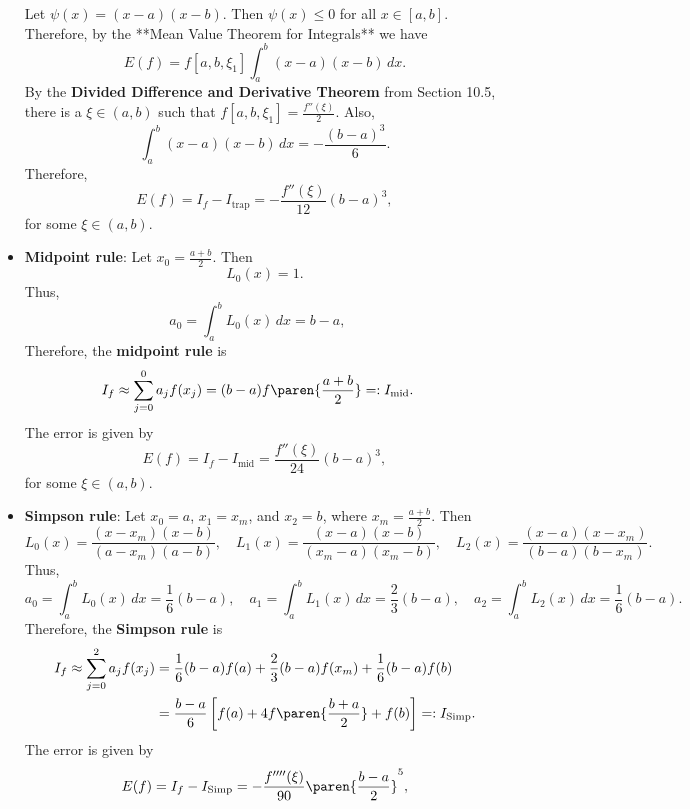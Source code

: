 \documentclass{report}
\begin{document}
\begin{itemize}
$$            $$
            Let $\psi(x) = (x - a)(x - b)$. Then $\psi(x) \leq 0$ for all $x \in [a,b]$. Therefore, by the **Mean Value Theorem for Integrals** we have
            $$
            E(f) = f[a,b,\xi_1] \int_a^b (x - a)(x - b)\,dx.
            $$
            By the \textbf{Divided Difference and Derivative Theorem} from Section 10.5, there is a $\xi \in (a, b)$ such that $f[a,b,\xi_1] = \frac{f''(\xi)}{2}$. Also, 
            $$
            \int_a^b (x - a)(x - b)\,dx = -\frac{(b - a)^3}{6}.
            $$
            Therefore,
            $$
            E(f) = I_f - I_{\mathrm{trap}} =  -\frac{f''(\xi)}{12}(b - a)^3,
            $$
            for some $\xi \in (a,b)$.
        \item \textbf{Midpoint rule}:
            Let $x_0 = \frac{a+b}{2}$. Then
            $$
            L_0(x) = 1.
            $$
            Thus,
            $$
            a_0 = \int_a^b L_0(x)\,dx = b - a, \quad 
            $$
            Therefore, the \textbf{midpoint rule} is
            \begin{align*}
                I_f \approx \sum_{j=0}^0 a_j f(x_j) &= (b - a) f\paren{\frac{a+b}{2}} =: I_{\mathrm{mid}}.
            \end{align*}
            The error is given by
            $$
            E(f) = I_f - I_{\mathrm{mid}} = \frac{f''(\xi)}{24}(b - a)^3,
            $$
            for some $\xi \in (a,b)$.
        \item \textbf{Simpson rule}:
            Let $x_0 = a$, $x_1 = x_m$, and $x_2 = b$, where $x_m = \frac{a+b}{2}$. Then
            $$
            L_0(x) = \frac{(x - x_m)(x - b)}{(a - x_m)(a - b)}, \quad 
            L_1(x) = \frac{(x - a)(x - b)}{(x_m - a)(x_m - b)}, \quad
            L_2(x) = \frac{(x - a)(x - x_m)}{(b - a)(b - x_m)}.
            $$
            Thus,
            $$
            a_0 = \int_a^b L_0(x)\,dx = \frac{1}{6}(b-a), \quad 
            a_1 = \int_a^b L_1(x)\,dx = \frac{2}{3}(b-a), \quad
            a_2 = \int_a^b L_2(x)\,dx = \frac{1}{6}(b-a). \quad 
            $$
            Therefore, the \textbf{Simpson rule} is
            \begin{align*}
                I_f \approx \sum_{j=0}^2 a_j f(x_j) 
&= \frac{1}{6}(b-a) f(a) + \frac{2}{3}(b-a) f(x_m) + \frac{1}{6}(b-a) f(b)\\
&= \frac{b - a}{6} \left[f(a) + 4f\paren{\frac{b+a}{2}} + f(b)\right]=: I_{\mathrm{Simp}}.
            \end{align*}
            The error is given by
            $$
            E(f) = I_f - I_{\mathrm{Simp}} = -\frac{f''''(\xi)}{90}\paren{\frac{b - a}{2}}^5,
$$
\end{itemize}
\end{document}
